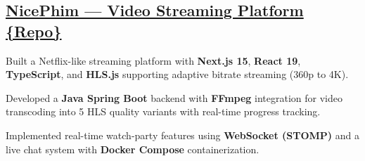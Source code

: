 \subsection{\href{https://github.com/hjsad1994/NicePhim}{NicePhim --- Video Streaming Platform} \href{https://github.com/hjsad1994/NicePhim}{\{Repo\}}}
\begin{zitemize}
\item Built a Netflix-like streaming platform with \textbf{Next.js 15}, \textbf{React 19}, \textbf{TypeScript}, and \textbf{HLS.js} supporting adaptive bitrate streaming (360p to 4K).
\item Developed a \textbf{Java Spring Boot} backend with \textbf{FFmpeg} integration for video transcoding into 5 HLS quality variants with real-time progress tracking.
\item Implemented real-time watch-party features using \textbf{WebSocket (STOMP)} and a live chat system with \textbf{Docker Compose} containerization.
\end{zitemize}
